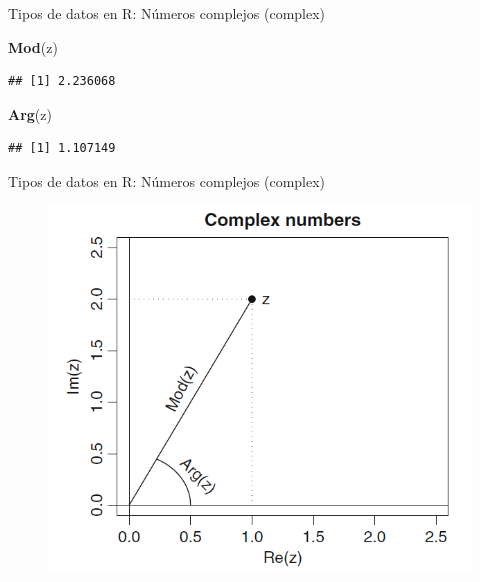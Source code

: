 \documentclass[ignorenonframetext,]{beamer}
\newenvironment{Shaded}{\begin{snugshade}}{\end{snugshade}}
\newcommand{\KeywordTok}[1]{\textcolor[rgb]{0.13,0.29,0.53}{\textbf{#1}}}
\newcommand{\NormalTok}[1]{#1}
\begin{document}
\begin{frame}[fragile]{Tipos de datos en R: Números complejos (complex)}

\begin{Shaded}
\begin{Highlighting}[]
\KeywordTok{Mod}\NormalTok{(z)}
\end{Highlighting}
\end{Shaded}

\begin{verbatim}
## [1] 2.236068
\end{verbatim}

\begin{Shaded}
\begin{Highlighting}[]
\KeywordTok{Arg}\NormalTok{(z)}
\end{Highlighting}
\end{Shaded}

\begin{verbatim}
## [1] 1.107149
\end{verbatim}

\end{frame}

\begin{frame}{Tipos de datos en R: Números complejos (complex)}

\begin{center}
\begin{figure}
\includegraphics[scale=0.5]{complex.png}
\end{figure}
\end{center}


\end{frame}
\end{document}
